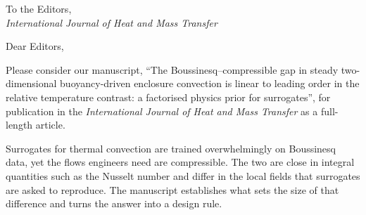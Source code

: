 \documentclass[11pt]{article}
\begin{document}
\noindent
To the Editors,\\
\emph{International Journal of Heat and Mass Transfer}

\vspace{10pt}
\noindent
Dear Editors,

\noindent
Please consider our manuscript, ``The Boussinesq--compressible gap in steady two-dimensional
buoyancy-driven enclosure convection is linear to leading order in the relative temperature
contrast: a factorised physics prior for surrogates'', for publication in the \emph{International Journal of
Heat and Mass Transfer} as a full-length article.

\noindent
Surrogates for thermal convection are trained overwhelmingly on Boussinesq data, yet the flows
engineers need are compressible. The two are close in integral quantities such as the Nusselt
number and differ in the local fields that surrogates are asked to reproduce. The manuscript
establishes what sets the size of that difference and turns the answer into a design rule.
\end{document}
